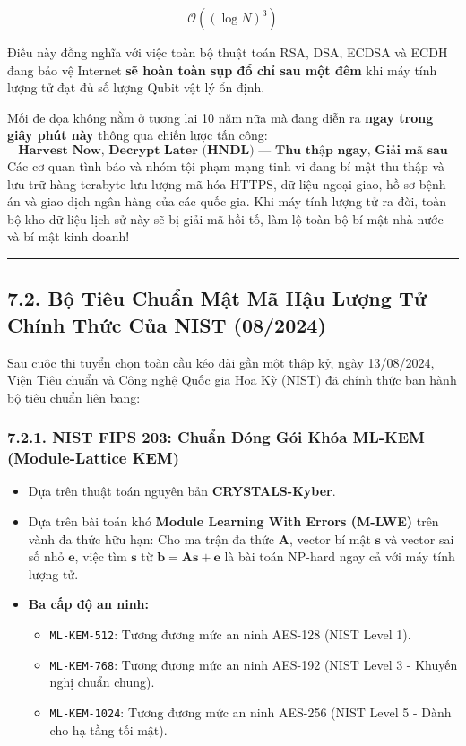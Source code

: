 \documentclass[
]{article}
\providecommand{\tightlist}{%
  \setlength{\itemsep}{0pt}\setlength{\parskip}{0pt}}
\begin{document}
\[\mathcal{O}\left((\log N)^3\right)\]

Điều này đồng nghĩa với việc toàn bộ thuật toán RSA, DSA, ECDSA và ECDH
đang bảo vệ Internet \textbf{sẽ hoàn toàn sụp đổ chỉ sau một đêm} khi
máy tính lượng tử đạt đủ số lượng Qubit vật lý ổn định.

Mối đe dọa không nằm ở tương lai 10 năm nữa mà đang diễn ra \textbf{ngay
trong giây phút này} thông qua chiến lược tấn công:
\[\textbf{Harvest Now, Decrypt Later (HNDL) — Thu thập ngay, Giải mã sau}\]
Các cơ quan tình báo và nhóm tội phạm mạng tinh vi đang bí mật thu thập
và lưu trữ hàng terabyte lưu lượng mã hóa HTTPS, dữ liệu ngoại giao, hồ
sơ bệnh án và giao dịch ngân hàng của các quốc gia. Khi máy tính lượng
tử ra đời, toàn bộ kho dữ liệu lịch sử này sẽ bị giải mã hồi tố, làm lộ
toàn bộ bí mật nhà nước và bí mật kinh doanh!

\begin{center}\rule{0.5\linewidth}{0.5pt}\end{center}

\subsection{7.2. Bộ Tiêu Chuẩn Mật Mã Hậu Lượng Tử Chính Thức Của NIST
(08/2024)}\label{bux1ed9-tiuxeau-chuux1ea9n-mux1eadt-muxe3-hux1eadu-lux1b0ux1ee3ng-tux1eed-chuxednh-thux1ee9c-cux1ee7a-nist-082024}

Sau cuộc thi tuyển chọn toàn cầu kéo dài gần một thập kỷ, ngày
13/08/2024, Viện Tiêu chuẩn và Công nghệ Quốc gia Hoa Kỳ (NIST) đã chính
thức ban hành bộ tiêu chuẩn liên bang:

\subsubsection{7.2.1. NIST FIPS 203: Chuẩn Đóng Gói Khóa ML-KEM
(Module-Lattice
KEM)}\label{nist-fips-203-chuux1ea9n-ux111uxf3ng-guxf3i-khuxf3a-ml-kem-module-lattice-kem}

\begin{itemize}
\tightlist
\item
  Dựa trên thuật toán nguyên bản \textbf{CRYSTALS-Kyber}.
\item
  Dựa trên bài toán khó \textbf{Module Learning With Errors (M-LWE)}
  trên vành đa thức hữu hạn: Cho ma trận đa thức \(\mathbf{A}\), vector
  bí mật \(\mathbf{s}\) và vector sai số nhỏ \(\mathbf{e}\), việc tìm
  \(\mathbf{s}\) từ \(\mathbf{b} = \mathbf{A}\mathbf{s} + \mathbf{e}\)
  là bài toán NP-hard ngay cả với máy tính lượng tử.
\item
  \textbf{Ba cấp độ an ninh:}

  \begin{itemize}
  \tightlist
  \item
    \texttt{ML-KEM-512}: Tương đương mức an ninh AES-128 (NIST Level 1).
  \item
    \texttt{ML-KEM-768}: Tương đương mức an ninh AES-192 (NIST Level 3 -
    Khuyến nghị chuẩn chung).
  \item
    \texttt{ML-KEM-1024}: Tương đương mức an ninh AES-256 (NIST Level 5
    - Dành cho hạ tầng tối mật).
  \end{itemize}
\end{itemize}
\end{document}
